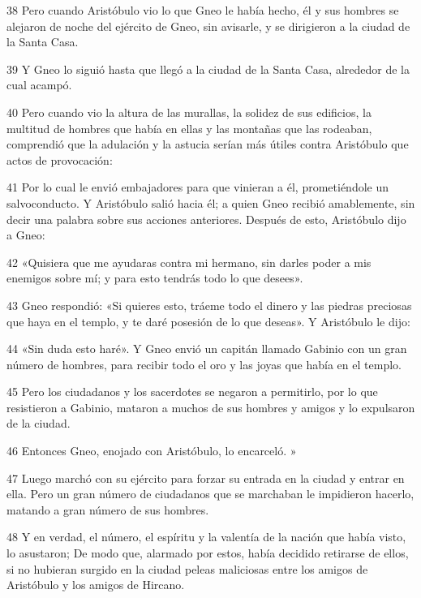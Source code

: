 \par 38 Pero cuando Aristóbulo vio lo que Gneo le había hecho, él y sus hombres se alejaron de noche del ejército de Gneo, sin avisarle, y se dirigieron a la ciudad de la Santa Casa.

\par 39 Y Gneo lo siguió hasta que llegó a la ciudad de la Santa Casa, alrededor de la cual acampó.

\par 40 Pero cuando vio la altura de las murallas, la solidez de sus edificios, la multitud de hombres que había en ellas y las montañas que las rodeaban, comprendió que la adulación y la astucia serían más útiles contra Aristóbulo que actos de provocación:

\par 41 Por lo cual le envió embajadores para que vinieran a él, prometiéndole un salvoconducto. Y Aristóbulo salió hacia él; a quien Gneo recibió amablemente, sin decir una palabra sobre sus acciones anteriores. Después de esto, Aristóbulo dijo a Gneo:

\par 42 «Quisiera que me ayudaras contra mi hermano, sin darles poder a mis enemigos sobre mí; y para esto tendrás todo lo que desees».

\par 43 Gneo respondió: «Si quieres esto, tráeme todo el dinero y las piedras preciosas que haya en el templo, y te daré posesión de lo que deseas». Y Aristóbulo le dijo:

\par 44 «Sin duda esto haré». Y Gneo envió un capitán llamado Gabinio con un gran número de hombres, para recibir todo el oro y las joyas que había en el templo.

\par 45 Pero los ciudadanos y los sacerdotes se negaron a permitirlo, por lo que resistieron a Gabinio, mataron a muchos de sus hombres y amigos y lo expulsaron de la ciudad.

\par 46 Entonces Gneo, enojado con Aristóbulo, lo encarceló. »

\par 47 Luego marchó con su ejército para forzar su entrada en la ciudad y entrar en ella. Pero un gran número de ciudadanos que se marchaban le impidieron hacerlo, matando a gran número de sus hombres.

\par 48 Y en verdad, el número, el espíritu y la valentía de la nación que había visto, lo asustaron; De modo que, alarmado por estos, había decidido retirarse de ellos, si no hubieran surgido en la ciudad peleas maliciosas entre los amigos de Aristóbulo y los amigos de Hircano.

